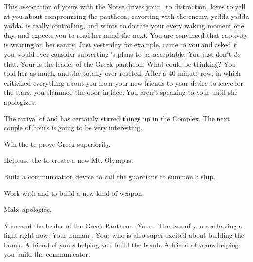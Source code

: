 \documentclass[char]{guardians}
\begin{document}
This association of yours with the Norse drives your \cHera{\parent}, \cHera{} to distraction. \cHera{\They} loves to yell at you about compromising the pantheon, cavorting with the enemy, yadda yadda yadda. \cHera{\They} is really controlling, and wants to dictate your every waking moment one day, and expects you to read her mind the next. You are convinced that captivity is wearing on her sanity. Just yesterday for example, \cHera{} came to you and asked if you would ever consider subverting \cZeus{}'s plans to be acceptable. You just don't \emph{do} that. Your \cZeus{\parent} is the leader of the Greek pantheon. What could \cHera{} be thinking? You told her as much, and she totally over reacted.  After a 40 minute row, in which \cHera{} criticized everything about you from your new friends to your desire to leave for the stars, you slammed the door in \cHera{\them} face. You aren't speaking to your \cHera{\parent} until she apologizes.

The arrival of \cUnity{} and \cKachiko{} has certainly stirred things up in the Complex. The next couple of hours is going to be very interesting.

\begin{itemz}[Goals]
  \item Win the \pGames{} to prove Greek superiority.
  \item Help \cZeus{} use the \stone{} to create a new Mt. Olympus.
  \item Build a communication device to call the guardians to summon a ship.
  \item Work with \cHephaestus{} and \cVal{} to build a new kind of weapon.
  \item Make \cHera{} apologize.
\end{itemz}


\begin{contacts}
  \contact{\cZeus{}} Your \cZeus{\parent} and the leader of the Greek Pantheon.
  \contact{\cHera{}} Your \cHera{\parent}. The two of you are having a fight right now.
  \contact{\cPandora{}} Your human \cPandora{\sibling}.
  \contact{\cHephaestus{}} Your \cHephaestus{\sibling} who is also super excited about building the bomb.
  \contact{\cVal{}} A friend of yours helping you build the bomb.
  \contact{\cFenrir{}} A friend of yours helping you build the communicator.
\end{contacts}
\end{document}
